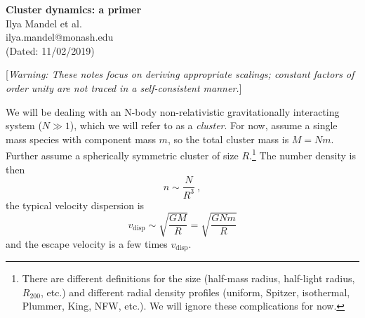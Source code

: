 \documentclass[amsmath,onecolumn]{aastex}
\begin{document}




\begin{center}
{\bf Cluster dynamics: a primer}\\
\vspace{0.2in}
Ilya Mandel et al.\\
ilya.mandel@monash.edu\\
(Dated: 11/02/2019)\\
\end{center}

\newcommand{\be}{\begin{equation}}
\newcommand{\ee}{\end{equation}}
\newcommand{\bel}[1]{\begin{equation}\label{#1}}
\newcommand{\ba}{\begin{eqnarray}}
\newcommand{\ea}{\end{eqnarray}}
\newcommand{\bal}[1]{\begin{eqnarray}\label{#1}}

\newcommand{\vdisp}{v_\textrm{disp}}
\newcommand{\vorb}{v_\textrm{orb}}
\newcommand{\tcross}{\tau_\textrm{cross}}
\newcommand{\tint}{\tau_\textrm{int}}
\newcommand{\tGW}{\tau_\textrm{GW}}
\newcommand{\tH}{\tau_\textrm{H}}
\newcommand{\tbinform}{\tau_\textrm{bin,form}}
\newcommand{\ahard}{a_\textrm{hard}}
\newcommand{\aeject}{a_\textrm{eject}}

\newcommand{\ilya}[1]{}


[{\it Warning: These notes focus on deriving appropriate scalings; constant factors of order unity are not traced in a self-consistent manner.}]

We will be dealing with an N-body non-relativistic gravitationally interacting system ($N \gg 1$), which we will refer to as a {\it cluster}.  For now, assume a single mass species with component mass $m$, so the total cluster mass is $M = N m$.  Further assume a spherically symmetric cluster of size $R$.\footnote{There are different definitions for the size (half-mass radius, half-light radius, $R_{200}$, etc.) and different radial density profiles (uniform, Spitzer, isothermal, Plummer, King, NFW, etc.).  We will ignore these complications for now.}  The number density is then
\be
n \sim \frac{N}{R^3}\ ,
\ee
the typical velocity dispersion is 
\be 
\vdisp \sim \sqrt{\frac{GM}{R}} = \sqrt{\frac{GNm}{R}}
\ee
and the escape velocity is a few times $\vdisp$.
\end{document}
